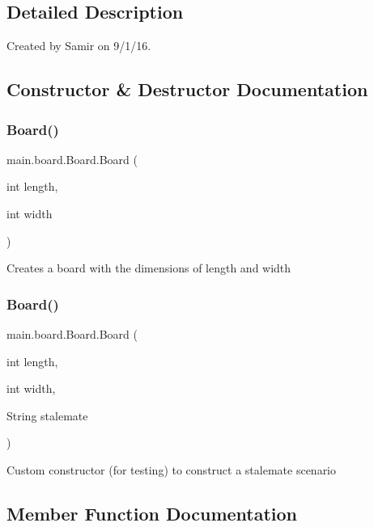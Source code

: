 \subsection{Detailed Description}
Created by Samir on 9/1/16. 

\subsection{Constructor \& Destructor Documentation}
\hypertarget{classmain_1_1board_1_1_board_afedcefaa4788e89abeb52d36e06e5c31}{}\label{classmain_1_1board_1_1_board_afedcefaa4788e89abeb52d36e06e5c31} 
\subsubsection{\texorpdfstring{Board()}{Board()}\hspace{0.1cm}{\footnotesize\ttfamily [1/2]}}
{\footnotesize\ttfamily main.\+board.\+Board.\+Board (\begin{DoxyParamCaption}\item[{int}]{length,  }\item[{int}]{width }\end{DoxyParamCaption})}

Creates a board with the dimensions of length and width \hypertarget{classmain_1_1board_1_1_board_a7d213ce6f77da69d7fc906d337265189}{}\label{classmain_1_1board_1_1_board_a7d213ce6f77da69d7fc906d337265189} 
\subsubsection{\texorpdfstring{Board()}{Board()}\hspace{0.1cm}{\footnotesize\ttfamily [2/2]}}
{\footnotesize\ttfamily main.\+board.\+Board.\+Board (\begin{DoxyParamCaption}\item[{int}]{length,  }\item[{int}]{width,  }\item[{String}]{stalemate }\end{DoxyParamCaption})}

Custom constructor (for testing) to construct a stalemate scenario 

\subsection{Member Function Documentation}
\hypertarget{classmain_1_1board_1_1_board_a3dbd760e456673620d827c7c9d389c93}{}\label{classmain_1_1board_1_1_board_a3dbd760e456673620d827c7c9d389c93} 
